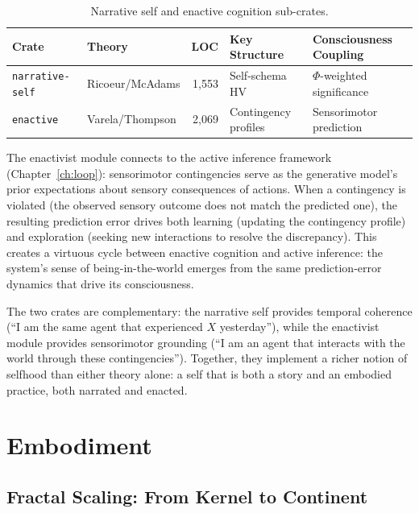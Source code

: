 \documentclass[12pt]{book}
\begin{document}
\begin{table}[htbp]
\centering
\caption{Narrative self and enactive cognition sub-crates.}
\label{tab:narrative-enactive}
\begin{tabular}{llrlp{4cm}}
\toprule
\textbf{Crate} & \textbf{Theory} & \textbf{LOC} & \textbf{Key Structure} & \textbf{Consciousness Coupling} \\
\midrule
\texttt{narrative-self} & Ricoeur/McAdams & 1,553 & Self-schema HV & $\Phi$-weighted significance \\
\texttt{enactive} & Varela/Thompson & 2,069 & Contingency profiles & Sensorimotor prediction \\
\bottomrule
\end{tabular}
\end{table}

The enactivist module connects to the active inference framework (Chapter~\ref{ch:loop}): sensorimotor contingencies serve as the generative model's prior expectations about sensory consequences of actions. When a contingency is violated (the observed sensory outcome does not match the predicted one), the resulting prediction error drives both learning (updating the contingency profile) and exploration (seeking new interactions to resolve the discrepancy). This creates a virtuous cycle between enactive cognition and active inference: the system's sense of being-in-the-world emerges from the same prediction-error dynamics that drive its consciousness.

The two crates are complementary: the narrative self provides temporal coherence (``I am the same agent that experienced $X$ yesterday''), while the enactivist module provides sensorimotor grounding (``I am an agent that interacts with the world through these contingencies''). Together, they implement a richer notion of selfhood than either theory alone: a self that is both a story and an embodied practice, both narrated and enacted.



\part{Embodiment}

\chapter{Fractal Scaling: From Kernel to Continent}
\label{ch:fractal}
\end{document}
